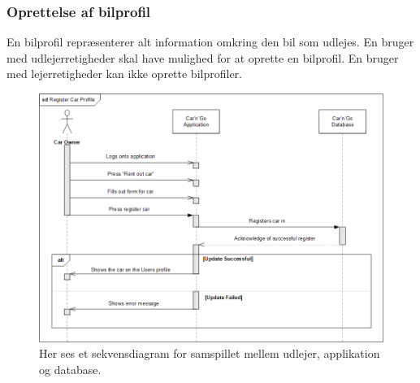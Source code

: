 \documentclass[Rapport/Rapport_main.tex]{subfiles}
\begin{document}
\subsubsection{Oprettelse af bilprofil}
En bilprofil repræsenterer alt information omkring den bil som udlejes. En bruger med udlejerretigheder skal have mulighed for at oprette en bilprofil. En bruger med lejerretigheder kan ikke oprette bilprofiler. 
\begin{figure}[H]
    \centering
    \includegraphics[width=1\textwidth]{Arkitektur/Softwarearkitektur/Car_registration/graphics/RegisterCarSD.png}
    \caption{Her ses et sekvensdiagram for samspillet mellem udlejer, applikation og database. }
    \label{fig:RegisterCarProfileSD}
\end{figure}
\end{document}
